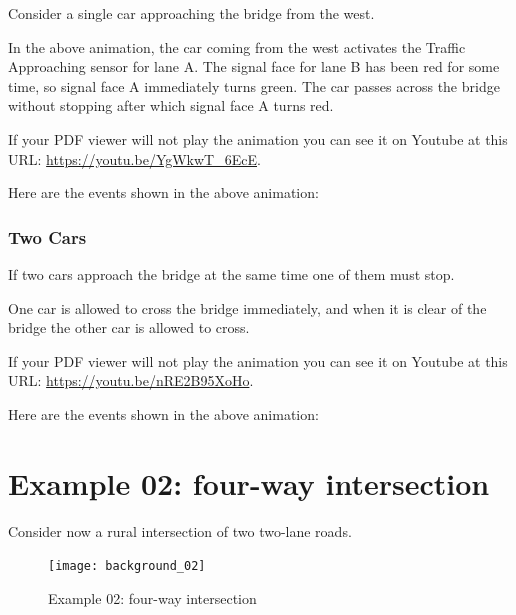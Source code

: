\documentclass[letterpaper,twoside]{article}
\begin{document}
Consider a single car approaching the bridge from the west.

\noindent{}

In the above animation, the car coming from the west activates the Traffic
Approaching sensor for lane A.  The signal face for lane B has been red
for some time, so signal face A immediately turns green.  The car passes
across the bridge without stopping after which signal face A turns red.

If your PDF viewer will not play the animation you can see it on Youtube
at this URL: 
\href{https://youtu.be/YgWkwT\_6EcE}{https://youtu.be/YgWkwT\_6EcE}.

Here are the events shown in the above animation:



\subsubsection{Two Cars}

If two cars approach the bridge at the same time one of them must stop.

\noindent{}

One car is allowed to cross the bridge immediately, and when it is
clear of the bridge the other car is allowed to cross.

If your PDF viewer will not play the animation you can see it on Youtube
at this URL:
\href{https://youtu.be/nRE2B95XoHo}{https://youtu.be/nRE2B95XoHo}.

Here are the events shown in the above animation:



\section{Example 02: four-way intersection}

Consider now a rural intersection of two two-lane roads.

\begin{figure}[htb]
  {\texttt{[image: background\_02]}}
  {\caption{Example 02: four-way intersection}
    \label{fig:four-way_intersection}}
\end{figure}
\end{document}
